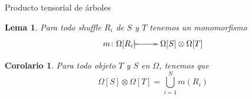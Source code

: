 \documentclass[12pt,aspectratio=169]{beamer}
\numberwithin{equation}{section}
\newtheorem{corol}[teo]{Corolario}
\newtheorem{lema}[teo]{Lema}
\theoremstyle{definition}
\begin{document}
\begin{frame}{Producto tensorial de \'arboles}
    \begin{lema}
        Para todo shuffle $R_i$ de $S$ y $T$ tenemos un monomorfismo
        $$
            \xymatrix{
                m\colon\Omega[R_i] \ar@{>->}[r] & \Omega[S]\otimes\Omega[T]
            }
        $$
    \end{lema}
    
    \begin{corol}
        Para todo objeto $T$ y $S$ en $\Omega$, tenemos que
        $$
            \Omega[S]\otimes\Omega[T] = \bigcup_{i=1}^{N} m(R_i)
        $$
    \end{corol}
\end{frame}
\end{document}

